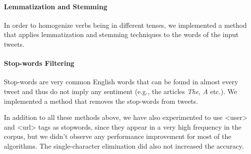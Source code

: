 \paragraph{\textbf{Lemmatization and Stemming}}
{\setlength{\parindent}{0cm}
In order to homogenize verbs being in different tenses, we implemented a method that applies lemmatization and stemming techniques to the words of the input tweets.}

\paragraph{\textbf{Stop-words Filtering}}
{\setlength{\parindent}{0cm}
Stop-words are very common English words that can be found in almost every tweet and thus do not imply any sentiment (e.g., the articles \textit{The}, \textit{A} etc.).
We implemented a method that removes the stop-words from tweets.}

In addition to all these methods above, we have also experimented to use <user> and <url> tags as stopwords, since they appear in a very high frequency in the corpus, but we didn't observe any performance improvement for most of the algorithms.
The single-character elimination did also not increased the accuracy.

